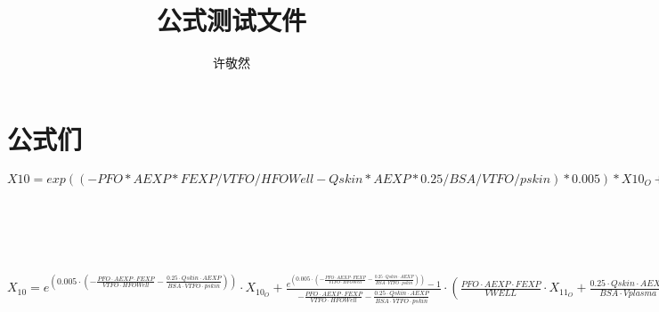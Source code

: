 \documentclass{article}
\date{}
\title{公式测试文件}
\author{许敬然}
\begin{document}
\maketitle
\section*{公式们}
$X10=exp((-PFO*AEXP*FEXP/VTFO/HFOWell-Qskin*AEXP*0.25/BSA/VTFO/pskin)*0.005)*X10_O +
((exp((-PFO*AEXP*FEXP/VTFO/HFOWell-Qskin*AEXP*0.25/BSA/VTFO/pskin)*0.005))-1)/(-PFO*AEXP*FEXP/VTFO/HFOWell-Qskin*AEXP*0.25/BSA/VTFO/pskin)*((PFO*AEXP*FEXP/VWELL)*X11_O+(Qskin*AEXP*0.25/BSA/Vplasma)*X17_O)$
\\
\\
\\
\\
\\
\\
\tiny$X_{10}=e^{ (0.005\cdot(-\frac{PFO \cdot AEXP\cdot FEXP}{VTFO\cdot HFOWell}- \frac{0.25\cdot Qskin\cdot AEXP}{BSA\cdot VTFO\cdot pskin}))}\cdot X_{10_O}  +
\frac{e^{ (0.005\cdot(-\frac{PFO \cdot AEXP\cdot FEXP}{VTFO\cdot HFOWell}- \frac{0.25\cdot Qskin\cdot AEXP}{BSA\cdot VTFO\cdot pskin})) }-1}{-\frac{PFO\cdot AEXP\cdot FEXP}{VTFO\cdot HFOWell}-\frac{0.25\cdot Qskin\cdot AEXP }{BSA\cdot VTFO\cdot pskin}}\cdot (\frac{PFO\cdot AEXP\cdot FEXP}{VWELL}\cdot X_{11_O}+\frac{0.25\cdot Qskin\cdot AEXP}{BSA\cdot Vplasma}\cdot X_{17_O})$
\end{document}
